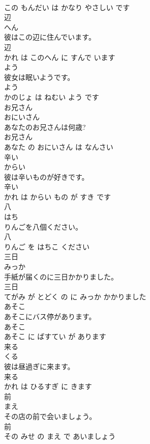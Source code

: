 \documentclass[8pt]{extreport}
\begin{document}
\begin{CJK}{UTF8}{min}
\\	この もんだい は かなり やさしい です			
\\	辺	
\\	へん			
\\	彼はこの辺に住んでいます。	
\\	辺 
\\	かれ は このへん に すんで います			
\\	よう	
\\	彼女は眠いようです。	
\\	よう 
\\	かのじょ は ねむい よう です			
\\	お兄さん	
\\	おにいさん			
\\	あなたのお兄さんは何歳?	
\\	お兄さん 
\\	あなた の おにいさん は なんさい			
\\	辛い	
\\	からい			
\\	彼は辛いものが好きです。	
\\	辛い 
\\	かれ は からい もの が すき です			
\\	八	
\\	はち			
\\	りんごを八個ください。	
\\	八 
\\	りんご を はちこ ください			
\\	三日	
\\	みっか			
\\	手紙が届くのに三日かかりました。	
\\	三日 
\\	てがみ が とどく の に みっか かかりました			
\\	あそこ	
\\	あそこにバス停があります。	
\\	あそこ 
\\	あそこ に ばすてい が あります			
\\	来る	
\\	くる			
\\	彼は昼過ぎに来ます。	
\\	来る 
\\	かれ は ひるすぎ に きます			
\\	前	
\\	まえ			
\\	その店の前で会いましょう。	
\\	前 
\\	その みせ の まえ で あいましょう			

\end{CJK}
\end{document}
